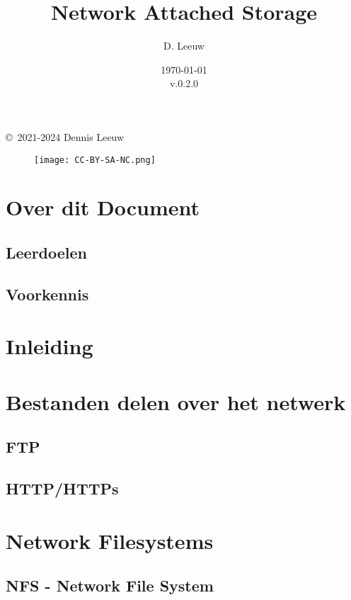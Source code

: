 \documentclass[a4paper,12pt,twoside,openright,titlepage]{book}
\author{D. Leeuw}
\title{Network Attached Storage}
\date{\today\\v.0.2.0}
\begin{document}

\maketitle

\copyright\ 2021-2024 Dennis Leeuw\\

\begin{figure}
\texttt{[image: CC-BY-SA-NC.png]}
\end{figure}

\bigskip




\frontmatter
\chapter{Over dit Document}
\section{Leerdoelen}

\section{Voorkennis}


\tableofcontents

\mainmatter
\chapter{Inleiding}

\chapter{Bestanden delen over het netwerk}
\section{FTP}
\section{HTTP/HTTPs}

\chapter{Network Filesystems}
\section{NFS - Network File System}

\end{document}
